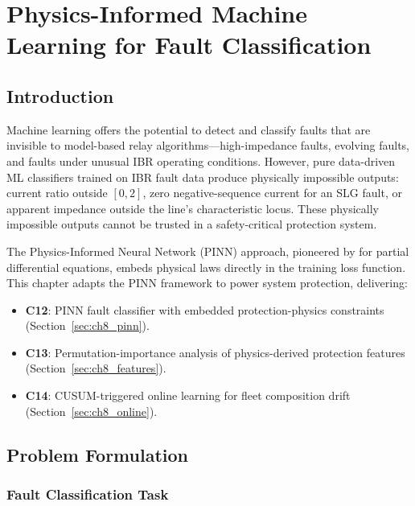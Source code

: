 \chapter{Physics-Informed Machine Learning for Fault Classification}
\label{ch:ml}

\section{Introduction}
\label{sec:ch8_intro}

Machine learning offers the potential to detect and classify faults
that are invisible to model-based relay algorithms—high-impedance faults,
evolving faults, and faults under unusual IBR operating conditions.
However, pure data-driven ML classifiers trained on IBR fault data
produce physically impossible outputs: current ratio outside $[0, 2]$,
zero negative-sequence current for an SLG fault, or apparent impedance
outside the line's characteristic locus. These physically impossible
outputs cannot be trusted in a safety-critical protection system.

The Physics-Informed Neural Network (PINN) approach, pioneered by
\citet{Raissi2019} for partial differential equations, embeds physical
laws directly in the training loss function. This chapter adapts the
PINN framework to power system protection, delivering:
\begin{itemize}
\item \textbf{C12}: PINN fault classifier with embedded protection-physics
      constraints (Section~\ref{sec:ch8_pinn}).
\item \textbf{C13}: Permutation-importance analysis of physics-derived
      protection features (Section~\ref{sec:ch8_features}).
\item \textbf{C14}: CUSUM-triggered online learning for fleet composition
      drift (Section~\ref{sec:ch8_online}).
\end{itemize}

\section{Problem Formulation}
\label{sec:ch8_problem}

\subsection{Fault Classification Task}

